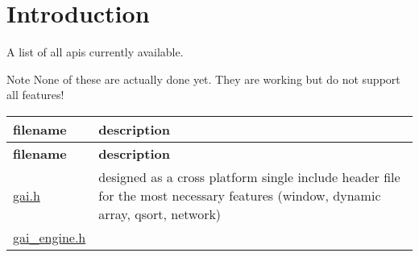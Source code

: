 \hypertarget{index_intro_sec}{}\section{Introduction}\label{index_intro_sec}
A list of all api\textquotesingle{}s currently available. \begin{DoxyNote}{Note}
None of these are actually done yet. They are working but do not support all features!
\end{DoxyNote}
\tabulinesep=1mm
\begin{longtabu} spread 0pt [c]{*{2}{|X[-1]}|}
\hline
\rowcolor{\tableheadbgcolor}\textbf{ filename }&\textbf{ description  }\\
\endfirsthead
\hline
\endfoot
\hline
\rowcolor{\tableheadbgcolor}\textbf{ filename }&\textbf{ description  }\\
\endhead
\hyperlink{gai_8h}{gai.\+h} &designed as a cross platform single include header file for the most necessary features (window, dynamic array, qsort, network) \\
\hyperlink{gai__engine_8h_source}{gai\+\_\+engine.\+h} &\\
\end{longtabu}

